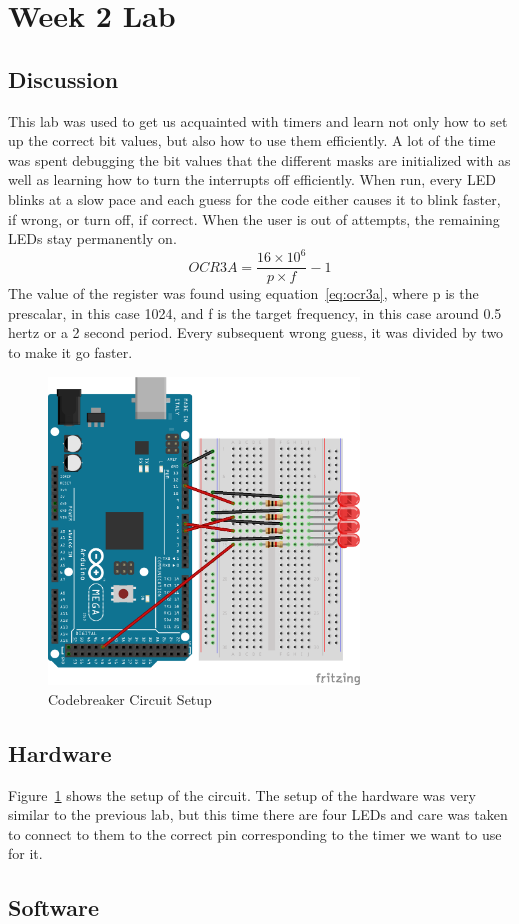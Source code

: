 \documentclass[12pt,titlepage]{article}
\begin{document}
\section{Week 2 Lab}
\subsection{Discussion}
This lab was used to get us acquainted with timers and learn not only how to set up the correct bit values, but also how to use them efficiently. A lot of the time was spent debugging the bit values that the different masks are initialized with as well as learning how to turn the interrupts off efficiently. When run, every LED blinks at a slow pace and each guess for the code either causes it to blink faster, if wrong, or turn off, if correct. When the user is out of attempts, the remaining LEDs stay permanently on.
\begin{equation} \label{eq:ocr3a}
  OCR3A = \frac{16\times10^6}{p\times f} - 1
\end{equation}
The value of the register was found using equation~\ref{eq:ocr3a}, where p is the prescalar, in this case 1024, and f is the target frequency, in this case around 0.5 hertz or a 2 second period. Every subsequent wrong guess, it was divided by two to make it go faster.
\begin{figure}[!htb]
  \centering
  \includegraphics[width=3.25in]{lab_3_schematic.png}
  \caption{Codebreaker Circuit Setup}\label{fig:lab_3}
\end{figure}
\subsection{Hardware}
Figure~\ref{fig:lab_3} shows the setup of the circuit. The setup of the hardware was very similar to the previous lab, but this time there are four LEDs and care was taken to connect to them to the correct pin corresponding to the timer we want to use for it.
\subsection{Software}
  
\end{document}
